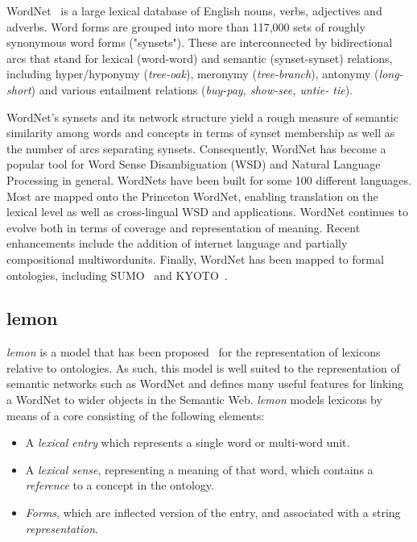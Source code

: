 \documentclass[10pt, a4paper]{article}
\newcommand{\lemon}[0]{\emph{lemon}}
\begin{document}
WordNet~\cite{miller1995wordnet,fellbaum1998wordnet,fellbaum2010wordnet} is a large lexical database of English nouns,
verbs, adjectives and adverbs. Word forms are grouped into more than 117,000 sets of
roughly synonymous word forms ("synsets"). These are interconnected by bidirectional
arcs that stand for lexical (word-word) and semantic (synset-synset) relations, including
hyper/hyponymy (\emph{tree-oak}), meronymy (\emph{tree-branch}), antonymy
(\emph{long-short}) and various entailment relations (\emph{buy-pay, show-see, untie-
tie}).

WordNet's synsets and its network structure yield a rough measure of semantic similarity
among words and concepts in terms of synset membership as well as the number of arcs
separating synsets. Consequently, WordNet has become a popular tool for Word Sense
Disambiguation (WSD) and Natural Language Processing in general. WordNets have
been built for some 100 different languages. Most are mapped onto the Princeton
WordNet, enabling translation on the lexical level as well as cross-lingual WSD and
applications. WordNet continues to evolve both in terms of coverage and representation
of meaning. Recent enhancements include the addition of internet language and partially
compositional multi­word­units. Finally, WordNet has been mapped to formal ontologies, 
including SUMO~\cite{niles2003mapping} and KYOTO~\cite{vossen2011kyoto}.

\subsection{lemon}

\lemon{} is a model that has been proposed~\cite{mccrae2012interchanging} for the representation of
lexicons relative to ontologies. As such, this model is well suited to the
representation of semantic networks such as WordNet and defines many useful
features for linking a WordNet to wider objects in the Semantic Web. \lemon{}
models lexicons by means of a core consisting of the following elements:

\begin{itemize}
  \item A \emph{lexical entry} which represents a single word or multi-word
    unit.
  \item A \emph{lexical sense}, representing a meaning of that word, which
    contains a \emph{reference} to a concept in the ontology.
  \item \emph{Forms}, which are inflected version of the entry, and associated
    with a string \emph{representation}.
\end{itemize}
\end{document}
